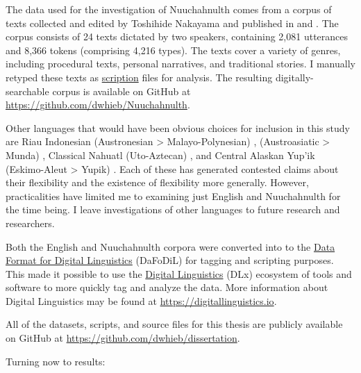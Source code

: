 The data used for the investigation of Nuuchahnulth comes from a corpus of texts collected and edited by Toshihide Nakayama and published in \textcite{Little2003} and \textcite{Louie2003}. The corpus consists of 24 texts dictated by two speakers, containing 2,081 utterances and 8,366 tokens (comprising 4,216 types). The texts cover a variety of genres, including procedural texts, personal narratives, and traditional stories. I manually retyped these texts as \href{https://scription.digitallinguistics.io}{scription} files  for analysis. The resulting digitally-searchable corpus is available on GitHub at \url{https://github.com/dwhieb/Nuuchahnulth}.

Other languages that would have been obvious choices for inclusion in this study are Riau Indonesian (Austronesian > Malayo-Polynesian) \parencite{Gil1994},  (Austroasiatic > Munda) \parencites{EvansOsada2005}{HengeveldRijkhoff2005}, Classical Nahuatl (Uto-Aztecan) \parencites{Launey1994}{Launey2004}, and Central Alaskan Yup'ik (Eskimo-Aleut > Yupik) \parencites{Thalbitzer1922}{Sadock1999}{Mithun2017}. Each of these has generated contested claims about their flexibility and the existence of flexibility more generally. However, practicalities have limited me to examining just English and Nuuchahnulth for the time being. I leave investigations of other languages to future research and researchers.

Both the English and Nuuchahnulth corpora were converted into to the \href{https://format.digitallinguistics.io}{Data Format for Digital Linguistics} (DaFoDiL)  for tagging and scripting purposes. This made it possible to use the \href{https://digitallinguistics.io}{Digital Linguistics} (DLx) ecosystem of tools and software to more quickly tag and analyze the data. More information about Digital Linguistics may be found at \url{https://digitallinguistics.io}.

All of the datasets, scripts, and source files for this thesis are publicly available on GitHub at \url{https://github.com/dwhieb/dissertation}.

Turning now to results:

